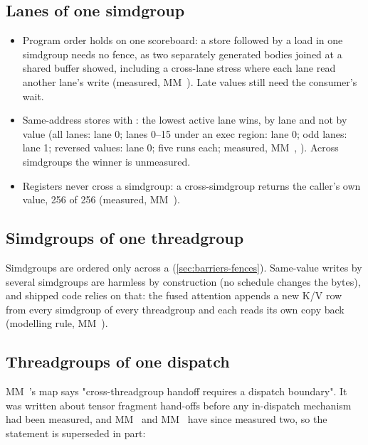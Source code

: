 \subsection*{Lanes of one simdgroup}

\begin{itemize}
\item Program order holds on one scoreboard: a store followed by a load in one simdgroup needs no fence, as two separately
  generated bodies joined at a shared buffer showed, including a cross-lane stress where each lane read another lane's
  write (measured, MM~). Late values still need the consumer's wait.
\item Same-address stores with : the lowest active lane wins, by lane and not by value (all
  lanes: lane 0; lanes 0–15 under an exec region: lane 0; odd lanes: lane 1; reversed values: lane 0; five runs each;
  measured, MM~, ). Across simdgroups the winner is unmeasured.
\item Registers never cross a simdgroup: a cross-simdgroup  returns the caller's own value, 256 of 256
  (measured, MM~).
\end{itemize}

\subsection*{Simdgroups of one threadgroup}

Simdgroups are ordered only across a  (\cref{sec:barriers-fences}). Same-value writes by several simdgroups are
harmless by construction (no schedule changes the bytes), and shipped code relies on that: the fused attention appends a
new K/V row from every simdgroup of every threadgroup and each reads its own copy back (modelling rule, MM~).

\subsection*{Threadgroups of one dispatch}

MM~'s map says "cross-threadgroup handoff requires a
dispatch boundary". It was written about tensor fragment hand-offs before any in-dispatch mechanism had been measured, and
MM~ and MM~ have since measured two, so the statement is superseded in part:

